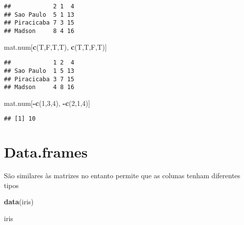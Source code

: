 \documentclass[]{article}
\newenvironment{Shaded}{\begin{snugshade}}{\end{snugshade}}
\newcommand{\KeywordTok}[1]{\textcolor[rgb]{0.13,0.29,0.53}{\textbf{#1}}}
\newcommand{\DecValTok}[1]{\textcolor[rgb]{0.00,0.00,0.81}{#1}}
\newcommand{\OperatorTok}[1]{\textcolor[rgb]{0.81,0.36,0.00}{\textbf{#1}}}
\newcommand{\NormalTok}[1]{#1}
\begin{document}
\begin{verbatim}
##            2 1  4
## Sao Paulo  5 1 13
## Piracicaba 7 3 15
## Madson     8 4 16
\end{verbatim}

\begin{Shaded}
\begin{Highlighting}[]
\NormalTok{mat.num[}\KeywordTok{c}\NormalTok{(T,F,T,T), }\KeywordTok{c}\NormalTok{(T,T,F,T)]}
\end{Highlighting}
\end{Shaded}

\begin{verbatim}
##            1 2  4
## Sao Paulo  1 5 13
## Piracicaba 3 7 15
## Madson     4 8 16
\end{verbatim}

\begin{Shaded}
\begin{Highlighting}[]
\NormalTok{mat.num[}\OperatorTok{-}\KeywordTok{c}\NormalTok{(}\DecValTok{1}\NormalTok{,}\DecValTok{3}\NormalTok{,}\DecValTok{4}\NormalTok{), }\OperatorTok{-}\KeywordTok{c}\NormalTok{(}\DecValTok{2}\NormalTok{,}\DecValTok{1}\NormalTok{,}\DecValTok{4}\NormalTok{)]}
\end{Highlighting}
\end{Shaded}

\begin{verbatim}
## [1] 10
\end{verbatim}

\section{Data.frames}\label{data.frames}

São similares às matrizes no entanto permite que as colunas tenham
diferentes tipos

\begin{Shaded}
\begin{Highlighting}[]
\KeywordTok{data}\NormalTok{(iris)}

\NormalTok{iris}
\end{Highlighting}
\end{Shaded}
\end{document}
